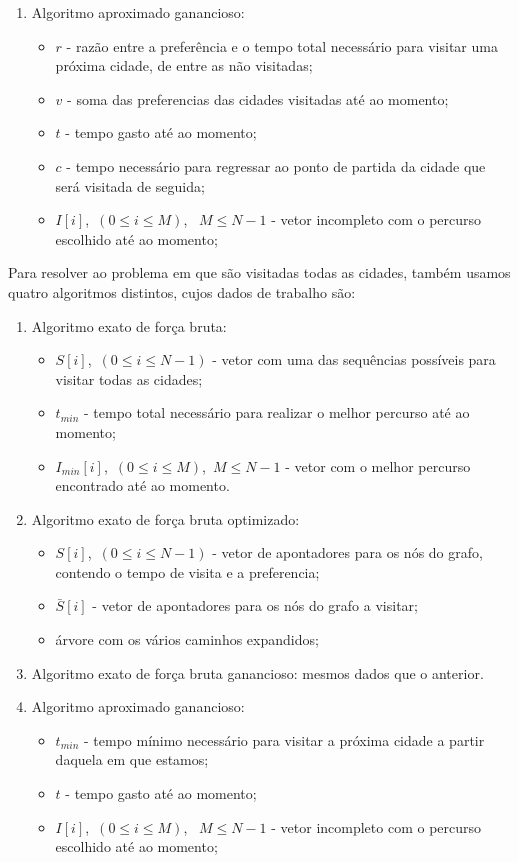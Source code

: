 \documentclass[12pt,a4paper,reqno]{report}
\numberwithin{equation}{section}
\begin{document}
\begin{enumerate}
\begin{itemize}
	\end{itemize}
	\item Algoritmo aproximado ganancioso:
	\begin{itemize}
		\item $r$ - razão entre a preferência e o tempo total necessário para visitar uma próxima cidade, de entre as não visitadas;
		\item $v$ - soma das preferencias das cidades visitadas até ao momento;
		\item $t$ - tempo gasto até ao momento;
		\item $c$ - tempo necessário para regressar ao ponto de partida da cidade que será visitada de seguida;
		\item $I[i]$,~$(0 \leq i \leq M)$, ~$M \leq N - 1$ - vetor incompleto com o percurso escolhido até ao momento;
	\end{itemize}
\end{enumerate}

Para resolver ao problema em que são visitadas todas as cidades, também usamos quatro algoritmos distintos, cujos dados de trabalho são:
\begin{enumerate}
	\item Algoritmo exato de força bruta:
	\begin{itemize}
		\item $S[i]$,~$(0 \leq i \leq N-1)$ - vetor com uma das sequências possíveis para visitar todas as cidades;
		\item $t_{min}$ - tempo total necessário para realizar o melhor percurso até ao momento;
		\item $I_{min}[i]$,~$(0 \leq i \leq M)$,~$ M \leq N - 1$ - vetor com o melhor percurso encontrado até ao momento.
	\end{itemize}
	\item Algoritmo exato de força bruta optimizado:
	\begin{itemize}
		\item $S[i]$,~$(0 \leq i \leq N-1)$ - vetor de apontadores para os nós do grafo, contendo o tempo de visita e a preferencia;
		\item $\bar{S}[i]$ - vetor de apontadores para os nós do grafo a visitar;
		\item árvore com os vários caminhos expandidos;
	\end{itemize}
	\item Algoritmo exato de força bruta ganancioso: mesmos dados que o anterior.
	\item Algoritmo aproximado ganancioso:
	\begin{itemize}
		\item $t_{min}$ - tempo mínimo necessário para visitar a próxima cidade a partir daquela em que estamos;
		\item $t$ - tempo gasto até ao momento;
		\item $I[i]$,~$(0 \leq i \leq M)$, ~$M \leq N - 1$ - vetor incompleto com o percurso escolhido até ao momento;
	\end{itemize}
\end{enumerate}
\end{document}
